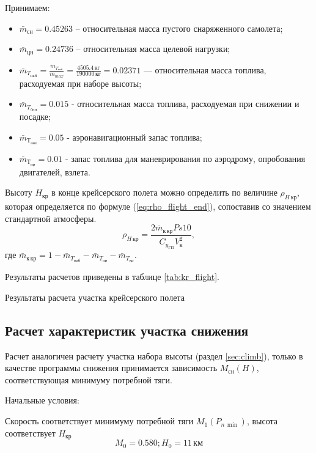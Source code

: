 Принимаем:
\begin{itemize}
    \item $\bar{m}_{сн} = 0.45263$ – относительная масса пустого снаряженного самолета;
    \item $\bar{m}_{цн} = 0.24736$ – относительная масса целевой нагрузки;
    \item $\bar{m}_{T_{наб}} = \frac{m_{T_{наб}}}{m_{max}} = \frac{4505.4\,
        \text{кг}}{190000\, \text{кг}} = 0.02371$ --- относительная масса
        топлива, расходуемая при наборе высоты;
    \item $\bar{m}_{T_{cнп}} =0.015$ - относительная масса топлива, расходуемая при
        снижении и посадке;
    \item $\bar{m}_{Т_{анз}} = 0.05$ - аэронавигационный запас топлива;
    \item $\bar{m}_{Т_{пр}} = 0.01$ - запас топлива для маневрирования по аэродрому, опробования
        двигателей, взлета.
\end{itemize}

Высоту $H_{кр}$ в конце крейсерского полета можно определить по величине
$\rho_{H\, кр}$, которая определяется по формуле (\ref{eq:rho_flight_end}),
сопоставив со значением стандартной атмосферы.
\begin{equation}
    \rho_{H\, {кр}} = \frac{2 \bar{m}_{к\, кр} Ps 10 }{C_{y_{ГП}} V_к^2},
    \label{eq:rho_flight_end}
\end{equation}
где $\bar{m}_{к\, кр} = 1 - \bar{m}_{T_{наб}} - \bar{m}_{T_{пр}} -
\bar{m}_{T_{кр}}$.

Результаты расчетов приведены в таблице \ref{tab:kr_flight}.

\begin{table}[H]
    \centering
    \caption{Результаты расчета участка крейсерского полета}
    \label{tab:kr_flight}
    
\end{table}

\subsection{Расчет характеристик участка снижения}\label{sec:descent}

Расчет аналогичен расчету участка набора высоты (раздел \ref{sec:climb}),
только в качестве программы снижения принимается зависимость $M_{сн}(H)$,
соответствующая минимуму потребной тяги.

Начальные условия:

Скорость соответствует минимуму потребной тяги $M_1(P_{n\, \min})$, высота соответствует $H_{кр}$
\[
    M_0=0.580; H_0 = 11\, \text{км}
\]


